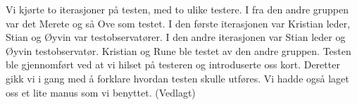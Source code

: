 Vi kjørte to iterasjoner på testen, med to ulike testere. I fra den andre
gruppen var det Merete og så Ove som testet. I  den første iterasjonen var
Kristian leder, Stian og Øyvin var testobservatører. I den andre iterasjonen var
Stian leder og Øyvin testobservatør. Kristian og Rune ble testet av den andre
gruppen. Testen ble gjennomført ved at vi hilset på testeren og introduserte oss
kort. Deretter gikk vi i gang med å forklare hvordan testen skulle utføres.
Vi hadde også laget oss et lite manus som vi benyttet. (Vedlagt)

